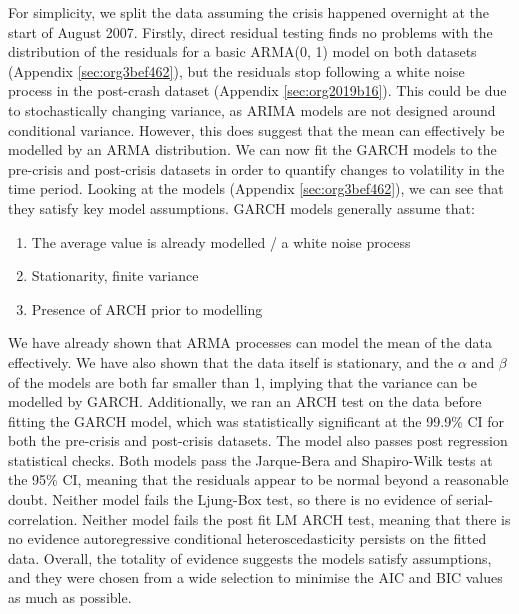 \documentclass[a4paper]{article}
\begin{document}
For simplicity, we split the data assuming the crisis happened overnight at the start of August 2007. Firstly, direct residual testing finds no problems with the distribution of the residuals for a basic ARMA(0, 1) model on both datasets (Appendix \ref{sec:org3bef462}), but the residuals stop following a white noise process in the post-crash dataset (Appendix \ref{sec:org2019b16}). This could be due to stochastically changing variance, as ARIMA models are not designed around conditional variance. However, this does suggest that the mean can effectively be modelled by an ARMA distribution. We can now fit the GARCH models to the pre-crisis and post-crisis datasets in order to quantify changes to volatility in the time period. Looking at the models (Appendix \ref{sec:org3bef462}), we can see that they satisfy key model assumptions. GARCH models generally assume that:
\begin{enumerate}
\item The average value is already modelled / a white noise process
\item Stationarity, finite variance
\item Presence of ARCH prior to modelling
\end{enumerate}

We have already shown that ARMA processes can model the mean of the data effectively. We have also shown that the data itself is stationary, and the \(\alpha\) and \(\beta\) of the models are both far smaller than 1, implying that the variance can be modelled by GARCH. Additionally, we ran an ARCH test on the data before fitting the GARCH model, which was statistically significant at the 99.9\% CI for both the pre-crisis and post-crisis datasets. The model also passes post regression statistical checks. Both models pass the Jarque-Bera and Shapiro-Wilk tests at the 95\% CI, meaning that the residuals appear to be normal beyond a reasonable doubt. Neither model fails the Ljung-Box test, so there is no evidence of serial-correlation. Neither model fails the post fit LM ARCH test, meaning that there is no evidence autoregressive conditional heteroscedasticity persists on the fitted data. Overall, the totality of evidence suggests the models satisfy assumptions, and they were chosen from a wide selection to minimise the AIC and BIC values as much as possible.

\hfill \newline
\end{document}
